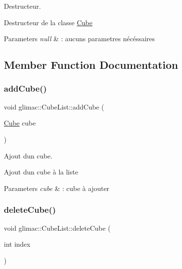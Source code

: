 Destructeur. 

Destructeur de la classe \hyperlink{classglimac_1_1Cube}{Cube}


\begin{DoxyParams}{Parameters}
{\em null} & \+: aucuns parametres nécéssaires \\
\hline
\end{DoxyParams}


\subsection{Member Function Documentation}
\mbox{\label{classglimac_1_1CubeList_adaa2b032e1ee67cd7dc9feaab94edc6d}} 
\subsubsection{\texorpdfstring{add\+Cube()}{addCube()}}
{\footnotesize\ttfamily void glimac\+::\+Cube\+List\+::add\+Cube (\begin{DoxyParamCaption}\item[{\hyperlink{classglimac_1_1Cube}{Cube}}]{cube }\end{DoxyParamCaption})}



Ajout d\textquotesingle{}un cube. 

Ajout d\textquotesingle{}un cube à la liste


\begin{DoxyParams}{Parameters}
{\em cube} & \+: cube à ajouter \\
\hline
\end{DoxyParams}
\mbox{\label{classglimac_1_1CubeList_ac8ffe918d3ff2788edd5c5bbfba45135}} 
\subsubsection{\texorpdfstring{delete\+Cube()}{deleteCube()}}
{\footnotesize\ttfamily void glimac\+::\+Cube\+List\+::delete\+Cube (\begin{DoxyParamCaption}\item[{int}]{index }\end{DoxyParamCaption})}



